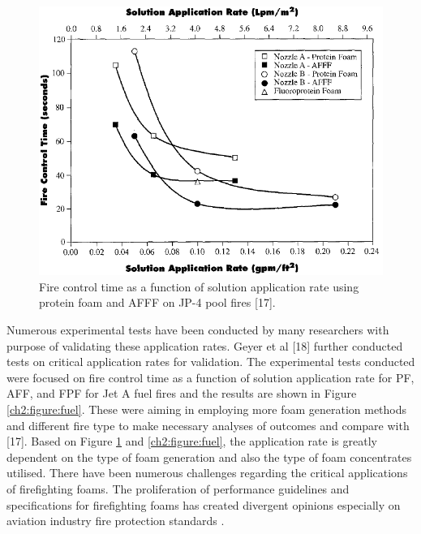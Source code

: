 \documentclass[12pt]{report}
\begin{document}
\begin{figure}[H]
    \centering
    \includegraphics[width=\textwidth]{fire_control_time_pool_fires.png}
    \caption{Fire control time as a function of solution application rate using protein foam and AFFF on JP-4 pool fires [17].}
    \label{ch2:figure:pool}
\end{figure}

Numerous experimental tests have been conducted by many researchers with purpose of validating these application rates. Geyer et al [18] further conducted tests on critical application rates for validation. The experimental tests conducted were focused on fire control time as a function of solution application rate for PF, AFF, and FPF for Jet A fuel fires and the results are shown in Figure \ref{ch2:figure:fuel}. These were aiming in employing more foam generation methods and different fire type to make necessary analyses of outcomes and compare with [17]. Based on Figure \ref{ch2:figure:pool} and \ref{ch2:figure:fuel}, the application rate is greatly dependent on the type of foam generation and also the type of foam concentrates utilised. There have been numerous challenges regarding the critical applications of firefighting foams. The proliferation of performance guidelines and specifications for firefighting foams has created divergent opinions especially on aviation industry fire protection standards \cite{scheffey1995evaluating}.
\end{document}
